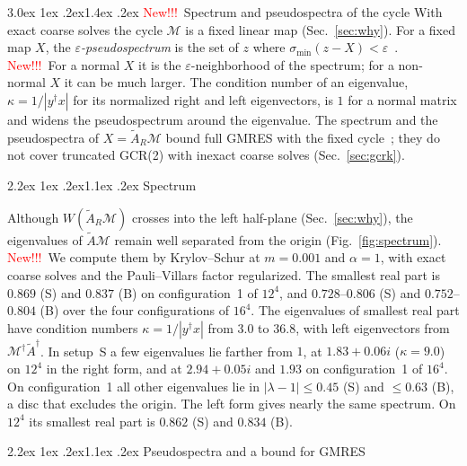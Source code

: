 \documentclass[11pt,a4paper]{article}
\makeatletter
\newif\ifshownew \shownewtrue
\DeclareRobustCommand\New{\ifshownew\textcolor{red}{New!!!}\ \else\ignorespaces\fi}
\renewcommand\section{\@startsection{section}{1}{\z@}%
  {3.0ex \@plus 1ex \@minus .2ex}{1.4ex \@plus .2ex}%
  {\centering\normalfont\normalsize\bfseries}}
\renewcommand\subsection{\@startsection{subsection}{2}{\z@}%
  {2.2ex \@plus 1ex \@minus .2ex}{1.1ex \@plus .2ex}%
  {\centering\normalfont\small\bfseries}}
\newcommand\FloatBarrier{\par\begingroup\let\@elt\relax
  \edef\@tempa{\@botlist\@deferlist\@dbldeferlist}%
  \ifx\@tempa\@empty\else\clearpage\fi\endgroup}
\let\origsection\section
\renewcommand\section{\FloatBarrier\origsection}
\numberwithin{equation}{section}
\newcommand{\dg}{^{\dagger}}
\newcommand{\AR}{\tilde A_{R}}
\makeatother
\begin{document}
\section{\New Spectrum and pseudospectra of the cycle}
\label{sec:spectral}
With exact coarse solves the cycle $\mathcal M$ is a fixed linear map (Sec.~\ref{sec:why}). For a
fixed map $X$, the \emph{$\varepsilon$-pseudospectrum} is the set of $z$ where
$\sigma_{\min}(z-X)<\varepsilon$~\cite{NRT,TrefethenEmbree}. \New For a normal $X$ it is the
$\varepsilon$-neighborhood of the spectrum; for a non-normal $X$ it can be much larger. The condition
number of an eigenvalue, $\kappa=1/|y\dg x|$ for its normalized right and left eigenvectors, is $1$
for a normal matrix and widens the pseudospectrum around the eigenvalue. The spectrum and the
pseudospectra of $X=\AR\mathcal M$ bound full GMRES with the fixed cycle~\cite{TrefethenEmbree}; they do
not cover truncated GCR(2) with inexact coarse solves (Sec.~\ref{sec:gcrk}).

\subsection{Spectrum}
\label{sec:spectrum}

Although $W(\AR\mathcal M)$ crosses into the left half-plane (Sec.~\ref{sec:why}), the eigenvalues of
$\tilde A\mathcal M$ remain well separated from the origin (Fig.~\ref{fig:spectrum}). \New We compute
them by Krylov--Schur at $m=0.001$ and $\alpha=1$, with exact coarse solves and the Pauli--Villars
factor regularized. The smallest real part is $0.869$ (S) and $0.837$ (B) on configuration~1 of
$12^4$, and $0.728$--$0.806$ (S) and $0.752$--$0.804$ (B) over the four configurations of $16^4$.
The eigenvalues of smallest real part have condition numbers $\kappa=1/|y\dg x|$ from $3.0$ to
$36.8$, with left eigenvectors from $\mathcal M\dg\tilde A\dg$. In setup~S a few eigenvalues lie
farther from $1$, at $1.83+0.06i$ ($\kappa=9.0$) on $12^4$ in the right form, and at $2.94+0.05i$ and $1.93$ on
configuration~1 of $16^4$. On configuration~1 all other eigenvalues lie in $|\lambda-1|\le0.45$ (S) and $\le0.63$ (B),
a disc that excludes the origin. The left form gives nearly the same spectrum. On $12^4$ its
smallest real part is $0.862$ (S) and $0.834$ (B).

\subsection{Pseudospectra and a bound for GMRES}
\label{sec:pseudo}
\end{document}
